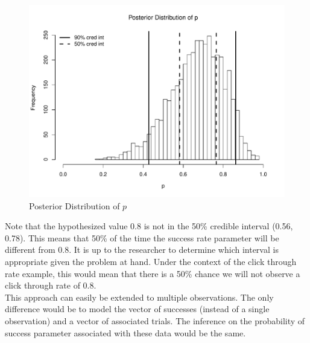 \documentclass[12pt]{article}
\begin{document}
\begin{figure}[H]\caption[]{Posterior Distribution of $p$}
\centering
\begin{minipage}{0.6\linewidth}
\includegraphics[trim={0cm 0cm 0cm 1.5cm}, clip, scale=0.6]{../figs/bin1.pdf}
\end{minipage}
\end{figure}

\noindent Note that the hypothesized value 0.8 is not in the 50\% credible interval (0.56, 0.78). This means that 50\% of the time the success rate parameter will be different from 0.8. It is up to the researcher to determine which interval is appropriate given the problem at hand. Under the context of the click through rate example, this would mean that there is a 50\% chance we will not observe a click through rate of 0.8.\\

\noindent This approach can easily be extended to multiple observations. The only difference would be to model the vector of successes (instead of a single observation) and a vector of associated trials. The inference on the probability of success parameter associated with these data would be the same. \\
\end{document}
